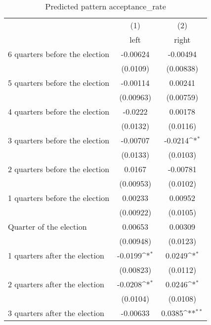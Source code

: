 \begin{table}[htbp]\centering
\def\sym#1{\ifmmode^{#1}\else\(^{#1}\)\fi}
\caption{Predicted pattern acceptance\_rate}
\begin{tabular}{l*{2}{c}}
\hline\hline
                    &\multicolumn{1}{c}{(1)}&\multicolumn{1}{c}{(2)}\\
                    &\multicolumn{1}{c}{left}&\multicolumn{1}{c}{right}\\
\hline
 6 quarters before the election&    -0.00624         &    -0.00494         \\
                    &    (0.0109)         &   (0.00838)         \\
[1em]
 5 quarters before the election&    -0.00114         &     0.00241         \\
                    &   (0.00963)         &   (0.00759)         \\
[1em]
 4 quarters before the election&     -0.0222         &     0.00178         \\
                    &    (0.0132)         &    (0.0116)         \\
[1em]
 3 quarters before the election&    -0.00707         &     -0.0214\sym{*}  \\
                    &    (0.0133)         &    (0.0103)         \\
[1em]
 2 quarters before the election&      0.0167         &    -0.00781         \\
                    &   (0.00953)         &    (0.0102)         \\
[1em]
 1 quarters before the election&     0.00233         &     0.00952         \\
                    &   (0.00922)         &    (0.0105)         \\
[1em]
Quarter of the election&     0.00653         &     0.00309         \\
                    &   (0.00948)         &    (0.0123)         \\
[1em]
 1 quarters after the election&     -0.0199\sym{*}  &      0.0249\sym{*}  \\
                    &   (0.00823)         &    (0.0112)         \\
[1em]
 2 quarters after the election&     -0.0208\sym{*}  &      0.0246\sym{*}  \\
                    &    (0.0104)         &    (0.0108)         \\
[1em]
 3 quarters after the election&    -0.00633         &      0.0385\sym{**} \\

\end{tabular}
\end{table}
